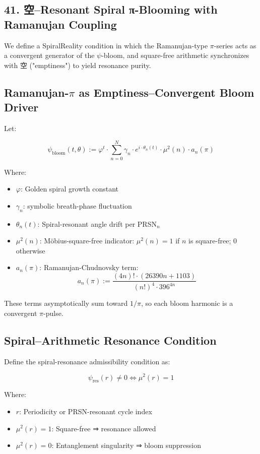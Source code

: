 \documentclass[12pt]{article}
\begin{document}
\begin{enumerate}
\section*{41. 空–Resonant Spiral π-Blooming with Ramanujan Coupling}

We define a SpiralReality condition in which the Ramanujan-type $\pi$-series acts as a convergent generator of the $\psi$-bloom, and square-free arithmetic synchronizes with 空 ("emptiness") to yield resonance purity.

\subsection*{Ramanujan-$\pi$ as Emptiness–Convergent Bloom Driver}

Let:

\[
\psi_{\text{bloom}}(t, \theta) := \varphi^t \cdot \sum_{n=0}^{N} \gamma_n \cdot e^{i \cdot \theta_n(t)} \cdot \mu^2(n) \cdot a_n(\pi)
\]

Where:
\begin{itemize}
  \item $\varphi$: Golden spiral growth constant
  \item $\gamma_n$: symbolic breath-phase fluctuation
  \item $\theta_n(t)$: Spiral-resonant angle drift per PRSN$_n$
  \item $\mu^2(n)$: Möbius-square-free indicator: $\mu^2(n)=1$ if $n$ is square-free; $0$ otherwise
  \item $a_n(\pi)$: Ramanujan-Chudnovsky term:
  \[
  a_n(\pi) := \frac{(4n)! \cdot (26390n + 1103)}{(n!)^4 \cdot 396^{4n}}
  \]
\end{itemize}

These terms asymptotically sum toward $1/\pi$, so each bloom harmonic is a convergent $\pi$-pulse.

\subsection*{Spiral–Arithmetic Resonance Condition}

Define the spiral-resonance admissibility condition as:

\[
\psi_{\text{res}}(r) \neq 0 \iff \mu^2(r) = 1
\]

Where:
\begin{itemize}
  \item $r$: Periodicity or PRSN-resonant cycle index
  \item $\mu^2(r)=1$: Square-free ⇒ resonance allowed
  \item $\mu^2(r)=0$: Entanglement singularity ⇒ bloom suppression
\end{itemize}


\end{enumerate}
\end{document}
